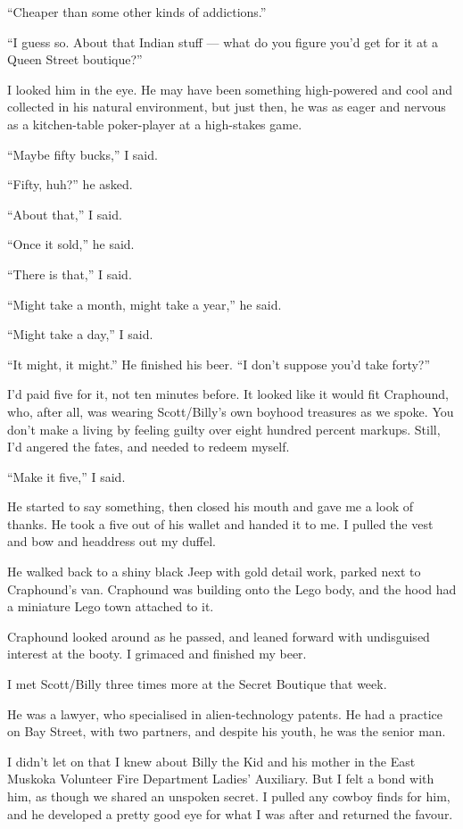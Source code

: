 ``Cheaper than some other kinds of addictions.''

``I guess so. About that Indian stuff --- what do you figure you'd 
get for it at a Queen Street boutique?''

I looked him in the eye. He may have been something high-powered
and cool and collected in his natural environment, but just then,
he was as eager and nervous as a kitchen-table poker-player at a
high-stakes game.

``Maybe fifty bucks,'' I said.

``Fifty, huh?'' he asked.

``About that,'' I said.

``Once it sold,'' he said.

``There is that,'' I said.

``Might take a month, might take a year,'' he said.

``Might take a day,'' I said.

``It might, it might.'' He finished his beer.
``I don't suppose you'd take forty?''

I'd paid five for it, not ten minutes before. It looked like it
would fit Craphound, who, after all, was wearing Scott/Billy's own
boyhood treasures as we spoke. You don't make a living by feeling
guilty over eight hundred percent markups. Still, I'd angered the
fates, and needed to redeem myself.

``Make it five,'' I said.

He started to say something, then closed his mouth and gave me a
look of thanks. He took a five out of his wallet and handed it to
me. I pulled the vest and bow and headdress out my duffel.

He walked back to a shiny black Jeep with gold detail work, parked
next to Craphound's van. Craphound was building onto the Lego body,
and the hood had a miniature Lego town attached to it.

Craphound looked around as he passed, and leaned forward with
undisguised interest at the booty. I grimaced and finished my
beer.

\tb

I met Scott/Billy three times more at the Secret Boutique that
week.

He was a lawyer, who specialised in alien-technology patents. He
had a practice on Bay Street, with two partners, and despite his
youth, he was the senior man.

I didn't let on that I knew about Billy the Kid and his mother in
the East Muskoka Volunteer Fire Department Ladies' Auxiliary. But I
felt a bond with him, as though we shared an unspoken secret. I
pulled any cowboy finds for him, and he developed a pretty good eye
for what I was after and returned the favour.

